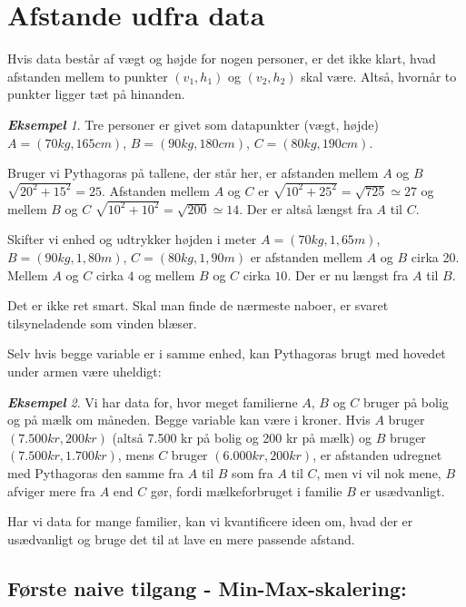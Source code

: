 \documentclass[a4paper, 12pt]{article}
\theoremstyle{remark}
\newtheorem{Eksempel}{\textbf{Eksempel}}
\begin{document}
\section*{Afstande udfra data}
Hvis data består af vægt og højde for nogen personer, er det ikke klart, hvad afstanden mellem to punkter $(v_1,h_1)$ og $(v_2,h_2)$ skal være. Altså, hvornår to punkter ligger tæt på hinanden. 
\begin{Eksempel}\label{ex:enheder og afstand}
Tre personer er givet som datapunkter (vægt, højde) $A=(70 kg, 165 cm)$, $B=(90 kg, 180 cm)$, $C=(80 kg, 190 cm)$.

Bruger vi Pythagoras på tallene, der står her, er afstanden mellem $A$ og $B$ $\sqrt{20^2+15^2}=25$. Afstanden mellem $A$ og $C$ er $\sqrt{10^2+25^2}=\sqrt{725}\simeq 27$ og mellem $B$ og $C$ $\sqrt{10^2+10^2}=\sqrt{200}\simeq 14$. Der er altså længst fra $A$ til $C$.

Skifter vi enhed og udtrykker højden i meter $A=(70 kg, 1,\!65 m)$, $B=(90 kg, 1,\!80 m)$, $C=(80 kg, 1,\!90 m)$ er afstanden mellem $A$ og $B$ cirka 20. Mellem $A$ og $C$ cirka $4$ og mellem $B$ og $C$ cirka $10$. Der er nu længst fra $A$ til $B$.

Det er ikke ret smart. Skal man finde de nærmeste naboer, er svaret tilsyneladende som vinden blæser. 

\end{Eksempel}

Selv hvis begge variable er i samme enhed, kan Pythagoras brugt med hovedet under armen være uheldigt:
\begin{Eksempel}
Vi har data for, hvor meget familierne $A$, $B$ og $C$  bruger på bolig og på mælk om måneden. Begge variable kan være i kroner. Hvis $A$ bruger $(7.500 kr, 200 kr)$ (altså 7.500 kr på bolig og 200 kr på mælk) og $B$ bruger $(7.500 kr, 1.700 kr)$, mens $C$ bruger $(6.000 kr, 200 kr)$, er afstanden udregnet med Pythagoras den samme fra $A$ til $B$ som fra $A$ til $C$, men vi vil nok mene, $B$ afviger mere fra $A$ end $C$ gør, fordi mælkeforbruget i familie $B$ er usædvanligt.

Har vi data for mange familier, kan vi kvantificere ideen om, hvad der er usædvanligt og bruge det til at lave en mere passende afstand. 
\end{Eksempel}

\subsection*{Første naive tilgang - Min-Max-skalering:}
\end{document}
